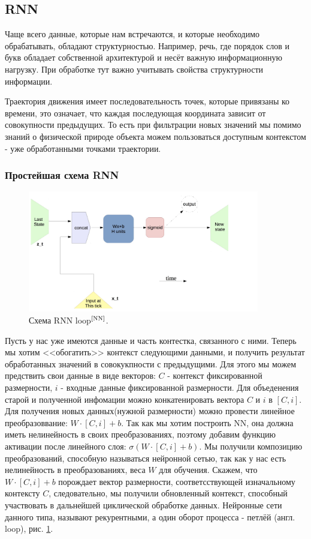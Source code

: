 \documentclass[a4paper,11pt]{article} %
\begin{document}
\subsection{RNN}
Чаще всего данные,  которые нам встречаются, и которые необходимо обрабатывать,  обладают структурностью.  Например, речь,  где порядок слов и букв обладает собственной архитектурой и несёт важную информационную нагрузку.  При обработке тут важно учитывать свойства структурности информации.  

Траектория движения имеет последовательность точек,  которые привязаны ко времени,  это означает,  что каждая последующая координата зависит от совокупности предыдущих.  То есть при фильтрации новых значений мы помимо знаний о физической природе объекта можем пользоваться доступным контекстом - уже обработанными точками траектории. 

\subsubsection{Простейшая схема  RNN}

\begin{figure}[h!]
\begin{center}
\includegraphics[width=0.9\textwidth]{images/RNN1}
\end{center}
\caption{Схема RNN loop$^\text{\cite{NN}}$.} \label{RNN1}
\end{figure}

Пусть у нас уже имеются данные и часть контестка,  связанного с ними. Теперь мы хотим <<обогатить>> контекст следующими данными,  и получить результат обработанных значений в совокукпности с предыдущими.  Для этого мы можем предствить свои данные в виде векторов:  $C$ - контекст фиксированной размерности,  $i$  -  входные данные фиксированной размерности.  Для объеденения старой и полученной инфомации можно конкатенировать вектора  $C$ и $i$ в $[C,i]$.  Для получения новых данных(нужной размерности) можно провести линейное преобразоввание: $W\cdot[C,i]+b$.  Так как мы хотим построить  NN,  она должна иметь  нелинейность в своих преобразованиях, поэтому добавим функцию активации после линейного слоя: $\sigma(W\cdot[C,i]+b)$.  Мы получили композицию преобразований, способную называться нейронной сетью, так как у нас есть нелинейность в преобразованиях,  веса $W$ для обучения.  Скажем, что  $W\cdot[C,i]+b$ порождает вектор размерности, соответсствующей изначальному контексту $C$,   следовательно, мы получили обновленный контекст,  способный участвовать в дальнейшей циклической обработке данных.  Нейронные сети данного типа,  называют рекурентными,  а один оборот процесса - петлёй (англ.  loop), рис.  \ref{RNN1}.
\end{document}

